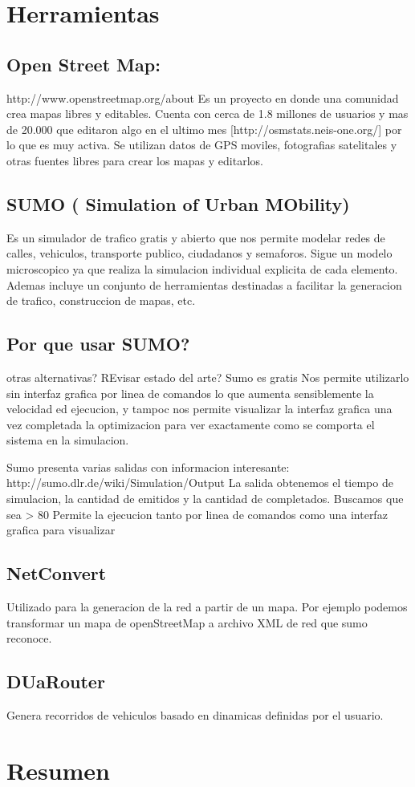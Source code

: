 \section{Herramientas}

\subsection{Open Street Map:} 
http://www.openstreetmap.org/about  Es un proyecto en donde una comunidad crea mapas libres y editables. Cuenta con cerca de 1.8 millones de usuarios  y  mas de 20.000 que editaron algo en el ultimo mes [http://osmstats.neis-one.org/] por lo que es muy activa. Se utilizan datos de GPS moviles, fotografias satelitales y otras fuentes libres para crear los mapas y editarlos. 

\subsection{SUMO ( Simulation of Urban MObility)}
Es un simulador de trafico gratis y abierto que nos permite modelar redes de calles, vehiculos, transporte publico, ciudadanos y semaforos. Sigue un modelo microscopico ya que realiza la simulacion individual explicita de cada elemento. Ademas incluye un conjunto de herramientas destinadas  a facilitar la generacion de trafico, construccion de mapas, etc. 


\subsection{Por que usar SUMO? }
otras alternativas? REvisar estado del arte?
Sumo es gratis
Nos permite utilizarlo sin interfaz grafica por linea de comandos lo que aumenta sensiblemente la velocidad ed ejecucion, y tampoc nos permite visualizar la interfaz grafica una vez completada la optimizacion para ver exactamente como se comporta el sistema en la simulacion.

Sumo presenta varias salidas con informacion interesante: http://sumo.dlr.de/wiki/Simulation/Output 
La salida obtenemos el tiempo de simulacion, la cantidad de emitidos y la cantidad de completados. Buscamos que sea > 80%
Permite la ejecucion tanto por linea de comandos como una interfaz grafica para visualizar

\subsection{NetConvert}
Utilizado para la generacion de la red a partir de un mapa. Por ejemplo podemos transformar un mapa de openStreetMap a archivo XML de red que sumo reconoce.

\subsection{DUaRouter}
 Genera recorridos de vehiculos basado en dinamicas definidas por el usuario.



\section{Resumen}

